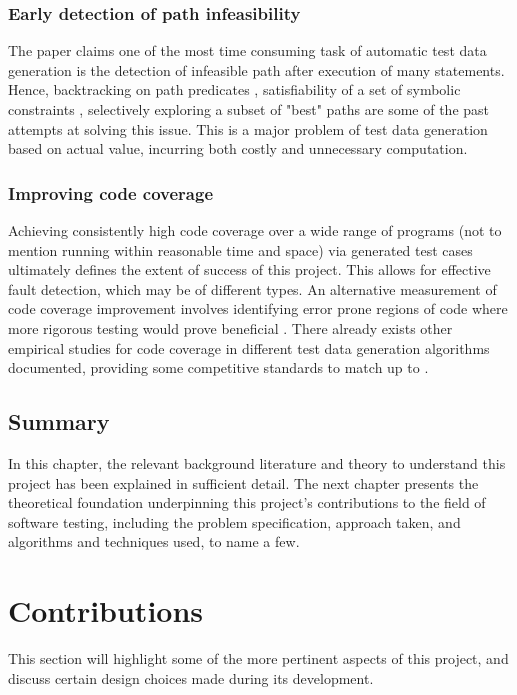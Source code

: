 \documentclass{icldt}
\numberwithin{equation}{section}       %
\newcommand{\blankpage}{
\newpage
\thispagestyle{empty}
\mbox{}
\newpage
}
\begin{document}
{\subsection{Early detection of path infeasibility}
The paper \cite{Tahbildar} claims one of the most time consuming task of automatic test data generation is the detection of infeasible path after execution of many statements. Hence, backtracking on path predicates \cite{Korel1990}, satisfiability of a set of symbolic constraints \cite{ZhangW01}, selectively exploring a subset of "best" paths \cite{Prather1987} are some of the past attempts at solving this issue. This is a major problem of test data generation based on actual value, incurring both costly and unnecessary computation.
\subsection{Improving code coverage}
Achieving consistently high code coverage over a wide range of programs (not to mention running within reasonable time and space) via generated test cases ultimately defines the extent of success of this project. This allows for effective fault detection, which may be of different types. An alternative measurement of code coverage improvement involves identifying error prone regions of code where more rigorous testing would prove beneficial \cite{Ntafos1988} \cite{InceDC1987}. There already exists other empirical studies for code coverage in different test data generation algorithms documented, providing some competitive standards to match up to \cite{Han2008} \cite{Rothermel99testcase} \cite{Lakhotia2009}.
\section{Summary}
In this chapter, the relevant background literature and theory to understand this project has been explained in sufficient detail. The next chapter presents the theoretical foundation underpinning this project's contributions to the field of software testing, including the problem specification, approach taken, and algorithms and techniques used, to name a few.
\chapter{Contributions}
\label{ch:contrib}
This section will highlight some of the more pertinent aspects of this project, and discuss certain design choices made during its development.

}
\end{document}
